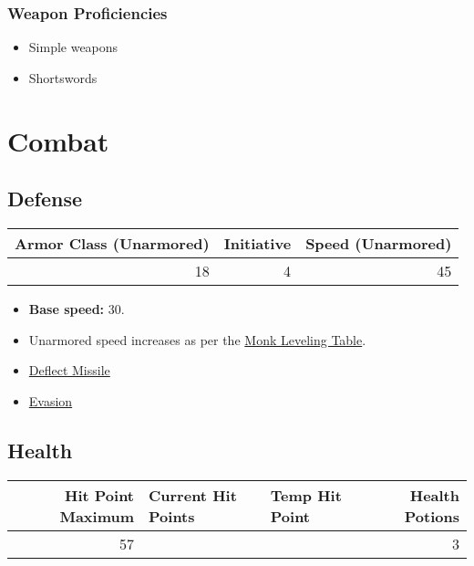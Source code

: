 \documentclass[11pt]{article}
\begin{document}
\subsubsection{Weapon Proficiencies}
\label{sec:orga1a6f3f}
\begin{itemize}
\item Simple weapons
\item Shortswords
\end{itemize}

\section{Combat}
\label{sec:org7eaa921}

\subsection{Defense}
\label{sec:org0c31c4e}

\begin{center}
\label{tab:org3c05fe6}
\begin{tabular}{rrr}
Armor Class (Unarmored) & Initiative & Speed (Unarmored)\\
\hline
18 & 4 & 45\\
\end{tabular}
\end{center}

\begin{itemize}
\item \textbf{Base speed:} 30.
\item Unarmored speed increases as per the \href{http://engl393-dnd5th.wikia.com/wiki/Monk}{Monk Leveling Table}.
\item \href{http://engl393-dnd5th.wikia.com/wiki/Monk\#Deflect\_Missiles}{Deflect Missile}
\item \href{http://dnd5e.wikia.com/wiki/Monk\#Evasion}{Evasion}
\end{itemize}

\subsection{Health}
\label{sec:org5029ca6}

\begin{center}
\label{tab:org0851d3e}
\begin{tabular}{rllr}
Hit Point Maximum & Current Hit Points & Temp Hit Point & Health Potions\\
\hline
57 &  &  & 3\\
\end{tabular}
\end{center}
\end{document}
